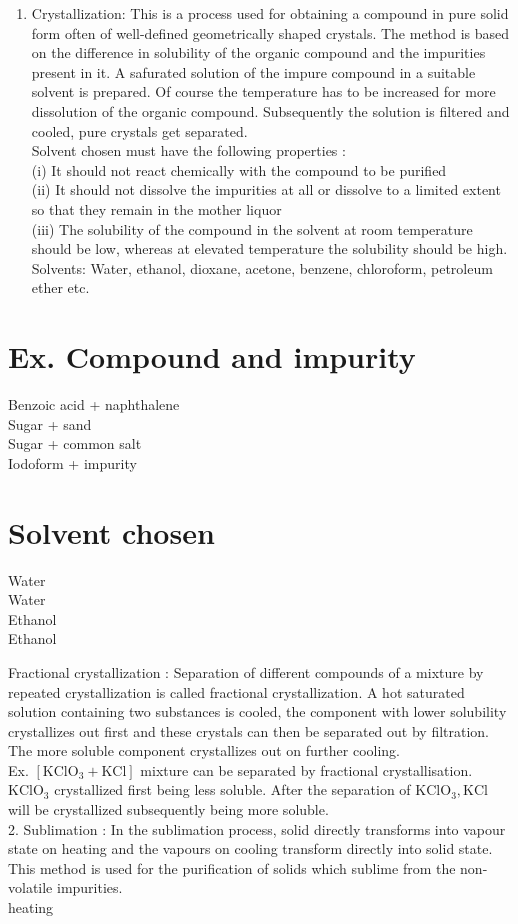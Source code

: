 \documentclass[10pt]{article}
\begin{document}
\begin{enumerate}
  \item Crystallization: This is a process used for obtaining a compound in pure solid form often of well-defined geometrically shaped crystals. The method is based on the difference in solubility of the organic compound and the impurities present in it. A safurated solution of the impure compound in a suitable solvent is prepared. Of course the temperature has to be increased for more dissolution of the organic compound. Subsequently the solution is filtered and cooled, pure crystals get separated.\\
Solvent chosen must have the following properties :\\
(i) It should not react chemically with the compound to be purified\\
(ii) It should not dissolve the impurities at all or dissolve to a limited extent so that they remain in the mother liquor\\
(iii) The solubility of the compound in the solvent at room temperature should be low, whereas at elevated temperature the solubility should be high.\\
Solvents: Water, ethanol, dioxane, acetone, benzene, chloroform, petroleum ether etc.
\end{enumerate}

\section*{Ex. Compound and impurity}
Benzoic acid + naphthalene\\
Sugar + sand\\
Sugar + common salt\\
Iodoform + impurity

\section*{Solvent chosen}
Water\\
Water\\
Ethanol\\
Ethanol

Fractional crystallization : Separation of different compounds of a mixture by repeated crystallization is called fractional crystallization. A hot saturated solution containing two substances is cooled, the component with lower solubility crystallizes out first and these crystals can then be separated out by filtration. The more soluble component crystallizes out on further cooling.\\
Ex. $\left[\mathrm{KClO}_{3}+\mathrm{KCl}\right]$ mixture can be separated by fractional crystallisation. $\mathrm{KClO}_{3}$ crystallized first being less soluble. After the separation of $\mathrm{KClO}_{3}, \mathrm{KCl}$ will be crystallized subsequently being more soluble.\\
2. Sublimation : In the sublimation process, solid directly transforms into vapour state on heating and the vapours on cooling transform directly into solid state. This method is used for the purification of solids which sublime from the non-volatile impurities.\\
heating
\end{document}
